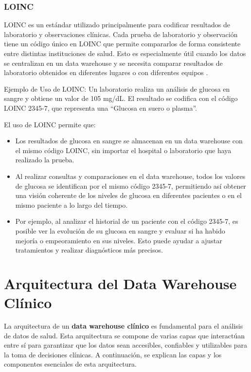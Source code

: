 \documentclass[12pt, a4paper, twoside]{article}
\begin{document}
	\subsubsection{LOINC}
	
	LOINC es un estándar utilizado principalmente para codificar resultados de laboratorio y observaciones clínicas. Cada prueba de laboratorio y observación tiene un código único en LOINC que permite compararlos de forma consistente entre distintas instituciones de salud. Esto es especialmente útil cuando los datos se centralizan en un data warehouse y se necesita comparar resultados de laboratorio obtenidos en diferentes lugares o con diferentes equipos \cite{meditecsInteroperabilidad}.
	
	Ejemplo de Uso de LOINC: Un laboratorio realiza un análisis de glucosa en sangre y obtiene un valor de 105 mg/dL. El resultado se codifica con el código LOINC 2345-7, que representa una “Glucosa en suero o plasma”\cite{loinc2345}.
	
	
	El uso de LOINC permite que:
	\begin{itemize}
		\item Los resultados de glucosa en sangre se almacenan en un data warehouse con el mismo código LOINC, sin importar el hospital o laboratorio que haya realizado la prueba.
		
		\item Al realizar consultas y comparaciones en el data warehouse, todos los valores de glucosa se identifican por el mismo código 2345-7, permitiendo así obtener una visión coherente de los niveles de glucosa en diferentes pacientes o en el mismo paciente a lo largo del tiempo.
		
		\item Por ejemplo, al analizar el historial de un paciente con el código 2345-7, es posible ver la evolución de su glucosa en sangre y evaluar si ha habido mejoría o empeoramiento en sus niveles. Esto puede ayudar a ajustar tratamientos y realizar diagnósticos más precisos.
	\end{itemize}
	
	
	
	\section{Arquitectura del Data Warehouse Clínico}
	
	La arquitectura de un \textbf{data warehouse clínico} es fundamental para el análisis de datos de salud. Esta arquitectura se compone de varias capas que interactúan entre sí para garantizar que los datos sean accesibles, confiables y utilizables para la toma de decisiones clínicas. A continuación, se explican las capas y los componentes esenciales de esta arquitectura.\cite{ESIC_DataWarehouse}
	
\end{document}
